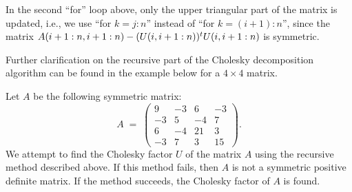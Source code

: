 In the second ``for'' loop above, only the upper triangular part of the matrix is
updated, i.e., we use ``for $k = j:n$'' instead of ``for $k = (i+1):n$'', since the
matrix $A(i+1:n,i+1:n) - (U(i,i+1:n))^{t} U(i,i+1:n)$ is symmetric.

Further clarification on the recursive part of the Cholesky decomposition algorithm
can be found in the example below for a $4 \times 4$ matrix.

\begin{examplex}
Let $A$ be the following symmetric matrix:
\begin{equation}
A \;=\; \begin{pmatrix} 9 & -3 & 6 & -3 \\ -3 & 5 & -4 & 7 \\ 6 & -4 & 21 & 3 \\ -3 & 7 &
3 & 15 \end{pmatrix}.
\end{equation}
We attempt to find the Cholesky factor $U$ of the matrix $A$ using the recursive
method described above. If this method fails, then $A$ is not a symmetric positive
definite matrix. If the method succeeds, the Cholesky factor of $A$ is found.


\end{examplex}
